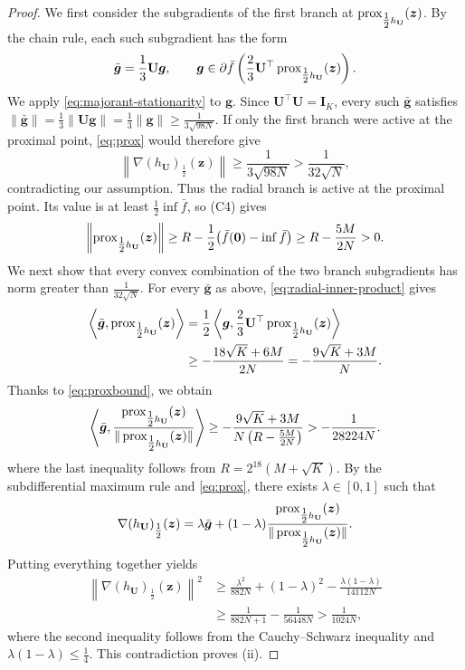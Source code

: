 \begin{proof}
We first consider the subgradients of the first branch
at $\operatorname{prox}_{\tfrac12 h_{\mathbf U}}(\bm z)$.
By the chain rule, each such subgradient has the form
\[
 \bar{\bm g}=\frac13\mathbf U\bm g,
 \qquad
 \bm g\in\partial\bar f\left(
 \frac23\mathbf U^\top
 \operatorname{prox}_{\tfrac12 h_{\mathbf U}}(\bm z)
 \right).
\]
We apply
\eqref{eq:majorant-stationarity} to $\bm g$.
Since $\mathbf U^\top\mathbf U=\mathbf I_K$,
every such $\bar{\bm g}$ satisfies
$
 \|\bar{\bm g}\|
 =\tfrac13\|\mathbf U\bm g\|
 =\tfrac13\|\bm g\|
 \ge\tfrac1{3\sqrt{98N}}.
$ 
If only the first branch were active at the proximal
point, \eqref{eq:prox} would therefore give 
\[
 \left\|\nabla(h_{\mathbf U})_{\tfrac12}(\bm z)\right\|
 \ge\frac1{3\sqrt{98N}}
 >\frac1{32\sqrt N},
\]
contradicting our assumption.
Thus the radial branch is active at the proximal point.
Its value is at least $\tfrac12\inf\bar f$, so
\textnormal{(C4)} gives
\begin{equation}
\label{eq:proxbound}
 \left\|\operatorname{prox}_{\tfrac12 h_{\mathbf U}}(\bm z)\right\|
 \ge R-\frac12\bigl(\bar f({\mathbf 0})-\inf\bar f\bigr)
 \ge R-\frac{5M}{2N}>0.
\end{equation}
We next show that every convex combination of the
two branch subgradients has norm greater than
$\tfrac1{32\sqrt N}$.
For every $\bar{\bm g}$ as above,
\eqref{eq:radial-inner-product} gives
\[
\begin{aligned}
 \left\langle
 \bar{\bm g},\operatorname{prox}_{\tfrac12 h_{\mathbf U}}(\bm z)
 \right\rangle
 &=\frac12\left\langle
 \bm g,\frac23\mathbf U^\top
 \operatorname{prox}_{\tfrac12 h_{\mathbf U}}(\bm z)
 \right\rangle\\
 &\ge-\frac{18\sqrt K+6M}{2N}
 =-\frac{9\sqrt K+3M}{N}.
\end{aligned}
\]
Thanks to \eqref{eq:proxbound}, we obtain
\[
 \left\langle
 \bar{\bm g},
 \frac{\operatorname{prox}_{\tfrac12 h_{\mathbf U}}(\bm z)}
 {\|\operatorname{prox}_{\tfrac12 h_{\mathbf U}}(\bm z)\|}
 \right\rangle
 \ge-\frac{9\sqrt K+3M}
 {N\left(R-\tfrac{5M}{2N}\right)}
 >-\frac1{28224N}.
\]
where the last inequality follows from
$R=2^{18}(M+\sqrt K)$. 
By the subdifferential maximum rule and \eqref{eq:prox}, there exists $\lambda\in[0,1]$ such that  
\[
 \nabla(h_{\mathbf U})_{\tfrac12}(\bm z)
 =
 \lambda\bar{\bm g}
 +(1-\lambda)
 \frac{\operatorname{prox}_{\tfrac12 h_{\mathbf U}}(\bm z)}
 {\|\operatorname{prox}_{\tfrac12 h_{\mathbf U}}(\bm z)\|}.
\]
Putting everything together yields 
\[
\begin{aligned}
 \left\|\nabla(h_{\mathbf U})_{\tfrac12}(\bm z)\right\|^2
 &\ge
 \frac{\lambda^2}{882N}
 +(1-\lambda)^2
 -\frac{\lambda(1-\lambda)}{14112N}\\
 &\ge
 \frac1{882N+1}-\frac1{56448N}>\frac1{1024N},
\end{aligned}
\]
where the second inequality follows from the Cauchy--Schwarz inequality and $\lambda(1-\lambda)\le\tfrac14$.
This contradiction proves (ii).
\end{proof}

